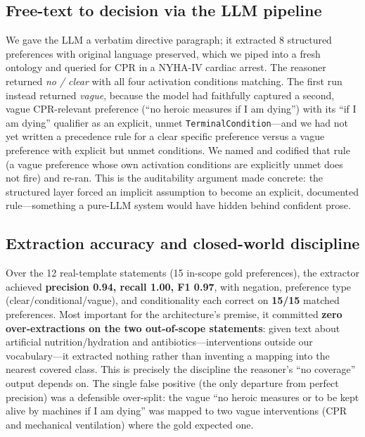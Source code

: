 \documentclass[10pt]{article}
\newcommand{\onto}[1]{\texttt{\small #1}}
\begin{document}
\subsection{Free-text to decision via the LLM pipeline}
We gave the LLM a verbatim directive paragraph; it extracted 8 structured preferences with original language preserved, which we piped into a fresh ontology and queried for CPR in a NYHA-IV cardiac arrest. The reasoner returned \emph{no / clear} with all four activation conditions matching. The first run instead returned \emph{vague}, because the model had faithfully captured a second, vague CPR-relevant preference (``no heroic measures if I am dying'') with its ``if I am dying'' qualifier as an explicit, unmet \onto{TerminalCondition}---and we had not yet written a precedence rule for a clear specific preference versus a vague preference with explicit but unmet conditions. We named and codified that rule (a vague preference whose own activation conditions are explicitly unmet does not fire) and re-ran. This is the auditability argument made concrete: the structured layer forced an implicit assumption to become an explicit, documented rule---something a pure-LLM system would have hidden behind confident prose.

\subsection{Extraction accuracy and closed-world discipline}
Over the 12 real-template statements (15 in-scope gold preferences), the extractor achieved \textbf{precision 0.94, recall 1.00, F1 0.97}, with negation, preference type (clear/conditional/vague), and conditionality each correct on \textbf{15/15} matched preferences. Most important for the architecture's premise, it committed \textbf{zero over-extractions on the two out-of-scope statements}: given text about artificial nutrition/hydration and antibiotics---interventions outside our vocabulary---it extracted nothing rather than inventing a mapping into the nearest covered class. This is precisely the discipline the reasoner's ``no coverage'' output depends on. The single false positive (the only departure from perfect precision) was a defensible over-split: the vague ``no heroic measures or to be kept alive by machines if I am dying'' was mapped to two vague interventions (CPR and mechanical ventilation) where the gold expected one.
\end{document}
